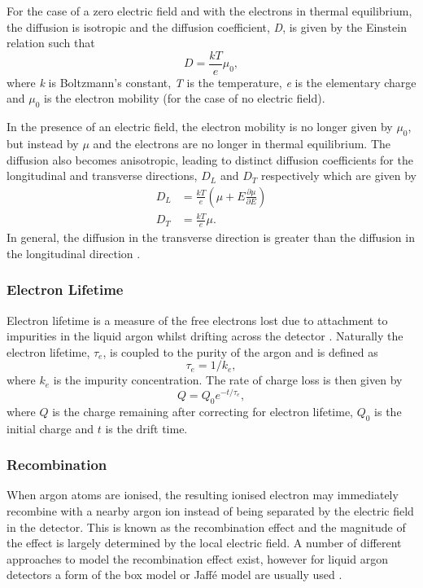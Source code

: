 For the case of a zero electric field and with the electrons in thermal equilibrium, the diffusion is isotropic and the diffusion coefficient, \textit{D}, is given by the Einstein relation such that
\begin{equation}
    D = \frac{kT}{e}\mu_0,
\end{equation}
where \textit{k} is Boltzmann's constant, \textit{T} is the temperature, \textit{e} is the elementary charge and $\mu_0$ is the electron mobility (for the case of no electric field).

In the presence of an electric field, the electron mobility is no longer given by $\mu_0$, but instead by $\mu$ and the electrons are no longer in thermal equilibrium. The diffusion also becomes anisotropic, leading to distinct diffusion coefficients for the longitudinal and transverse directions, $D_L$ and $D_T$ respectively which are given by
\begin{equation}
\begin{split}
    D_L &= \frac{kT}{e}(\mu + E \frac{\partial \mu}{\partial E}) \\
    D_T &= \frac{kT}{e}\mu.
\end{split}
\end{equation}
In general, the diffusion in the transverse direction is greater than the diffusion in the longitudinal direction \cite{LArTPC_book} \cite{diffusion}.

\subsubsection{Electron Lifetime}
 Electron lifetime is a measure of the free electrons lost due to attachment to impurities in the liquid argon whilst drifting across the detector \cite{ArgoNeuT_electron_lifetime_paper}. Naturally the electron lifetime, $\tau_{e}$, is coupled to the purity of the argon and is defined as 
 \begin{equation}
     \tau_{e} = 1/k_e,
 \end{equation}
 where $k_e$ is the impurity concentration. The rate of charge loss is then given by 
 \begin{equation}
     Q = Q_{0}e^{-t/\tau_e},
 \end{equation}
where $Q$ is the charge remaining after correcting for electron lifetime, $Q_0$ is the initial charge and $t$ is the drift time. 
 
\subsubsection{Recombination}
When argon atoms are ionised, the resulting ionised electron may immediately recombine with a nearby argon ion instead of being separated by the electric field in the detector. This is known as the recombination effect and the magnitude of the effect is largely determined by the local electric field. A number of different approaches to model the recombination effect exist, however for liquid argon detectors a form of the box model or Jaff\'{e} model are usually used \cite{LArTPC_book}.

